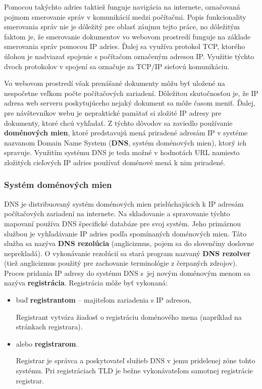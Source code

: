 Pomocou takýchto adries taktiež funguje navigácia na internete, označovaná pojmom smerovanie správ v komunikácií medzi počítačmi.
Popis funkcionality smerovania správ nie je dôležitý pre oblasť záujmu tejto práce, no dôležitým faktom je, 
že smerovanie dokumentov vo webovom prostredí funguje na základe smerovania správ pomocou IP adries. %
Ďalej sa využíva protokol TCP, ktorého úlohou je nadviazať spojenie s počítačom označeným adresou IP.
Využitie týchto dvoch protokolov v spojení sa označuje za TCP/IP sieťovú komunikáciu. %

Vo webovom prostredí však prenášané dokumenty môžu byť uložené na nespočetne veľkom počte počítačových zariadení.
Dôležitou skutočnosťou je, že IP adresa web serveru poskytujúceho nejaký dokument sa môže časom meniť.
Ďalej, pre návštevníkov webu je nepraktické pamätať si zložité IP adresy pre dokumenty, ktoré chcú vyhľadať.
Z týchto dôvodov sa zaviedlo používanie \textbf{doménových mien}, ktoré predstavujú mená priradené adresám IP v systéme nazvanom 
Domain Name System (\textbf{DNS}, systém doménových mien), ktorý ich spravuje. 
Využitím systému DNS je teda možné v hodnotách URL namiesto zložitých cieľových IP adries používať doménové mená k nim priradené. 

\subsubsection{Systém doménových mien}

DNS je distribuovaný systém doménových mien prislúchajúcich k IP adresám počítačových zariadení na internete.
Na skladovanie a spravovanie týchto mapovaní používa DNS špecifické databáze pre svoj systém. 
Jeho primárnou službou je vyhľadávanie IP adries podľa spomínaných doménových mien.
Táto služba sa nazýva \textbf{DNS rezolúcia} (anglicizmus, pojem sa do slovenčiny doslovne neprekladá). 
O vykonávanie rezolúcií sa stará program nazvaný \textbf{DNS rezolver} (tiež anglicizmus použitý pre zachovanie terminológie z čerpaných zdrojov).
Proces pridania IP adresy do systému DNS \mbox{s jej} novým doménovým menom sa nazýva \textbf{registrácia}.
Registrácia môže byť vykonaná:
\begin{itemize}
    \item buď \textbf{registrantom} -- majiteľom zariadenia s IP adresou,

    Registrant vytvára žiadosť o registráciu doménového mena (napríklad na stránkach registrara).

    \item alebo \textbf{registrarom}.

    Registrar je správca a poskytovateľ služieb DNS v jemu pridelenej zóne tohto systému. %
    Pri registráciach TLD je bežne vykonávateľom samotnej registrácie registrar. %
\end{itemize}

